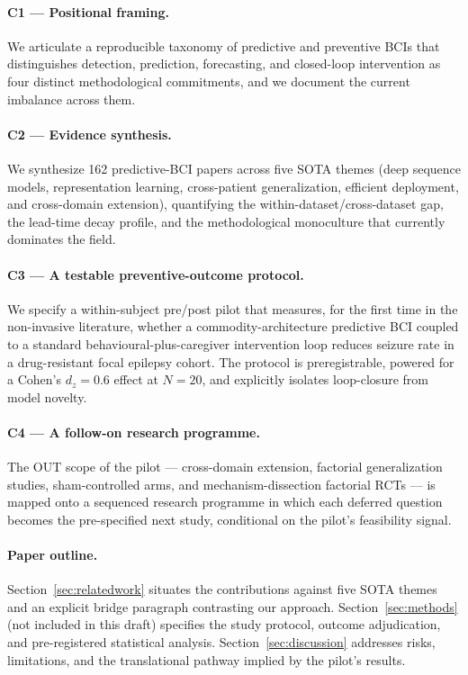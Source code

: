 \paragraph{C1 --- Positional framing.} We articulate a reproducible taxonomy of predictive and preventive BCIs that distinguishes detection, prediction, forecasting, and closed-loop intervention as four distinct methodological commitments, and we document the current imbalance across them.

\paragraph{C2 --- Evidence synthesis.} We synthesize 162 predictive-BCI papers across five SOTA themes (deep sequence models, representation learning, cross-patient generalization, efficient deployment, and cross-domain extension), quantifying the within-dataset/cross-dataset gap, the lead-time decay profile, and the methodological monoculture that currently dominates the field.

\paragraph{C3 --- A testable preventive-outcome protocol.} We specify a within-subject pre/post pilot that measures, for the first time in the non-invasive literature, whether a commodity-architecture predictive BCI coupled to a standard behavioural-plus-caregiver intervention loop reduces seizure rate in a drug-resistant focal epilepsy cohort. The protocol is preregistrable, powered for a Cohen's $d_z = 0.6$ effect at $N=20$, and explicitly isolates loop-closure from model novelty.

\paragraph{C4 --- A follow-on research programme.} The OUT scope of the pilot --- cross-domain extension, factorial generalization studies, sham-controlled arms, and mechanism-dissection factorial RCTs --- is mapped onto a sequenced research programme in which each deferred question becomes the pre-specified next study, conditional on the pilot's feasibility signal.

\paragraph{Paper outline.} Section~\ref{sec:relatedwork} situates the contributions against five SOTA themes and an explicit bridge paragraph contrasting our approach. Section~\ref{sec:methods} (not included in this draft) specifies the study protocol, outcome adjudication, and pre-registered statistical analysis. Section~\ref{sec:discussion} addresses risks, limitations, and the translational pathway implied by the pilot's results.
